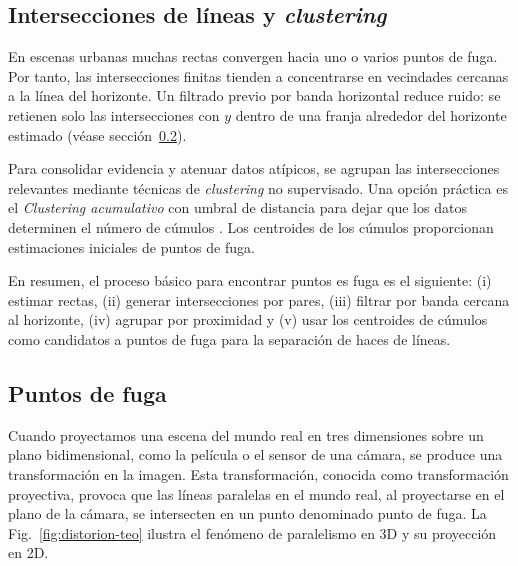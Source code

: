 \subsection{Intersecciones de líneas y \emph{clustering}}\label{sec:intersections-clustering}

En escenas urbanas muchas rectas convergen hacia uno o varios puntos de fuga. Por tanto, las
intersecciones finitas tienden a concentrarse en vecindades cercanas a la línea del horizonte. Un filtrado previo por banda horizontal reduce ruido: se retienen solo las intersecciones con \(y\) dentro de una franja alrededor del horizonte estimado (véase sección~\ref{sec:vanishing-points}).


Para consolidar evidencia y atenuar datos atípicos, se agrupan las intersecciones relevantes mediante técnicas de \emph{clustering} no supervisado. Una opción práctica es el \emph{Clustering acumulativo} con umbral de distancia para dejar que los datos determinen el número de cúmulos \cite{tan2005introduction}. Los centroides de los cúmulos proporcionan estimaciones iniciales de puntos de fuga\cite{kanatani1998statistical,hartley2003multiple}.


En resumen, el proceso básico para encontrar puntos es fuga es el siguiente: (i) estimar rectas, (ii) generar intersecciones por pares, (iii) filtrar por banda cercana al horizonte, (iv) agrupar por proximidad y (v) usar los centroides de cúmulos como candidatos a puntos de fuga para la separación de haces de líneas.

\subsection{Puntos de fuga}\label{sec:vanishing-points}

Cuando proyectamos una escena del mundo real en tres dimensiones sobre un plano bidimensional,
como la película o el sensor de una cámara, se produce una transformación en la imagen.
Esta transformación, conocida como transformación proyectiva, provoca que las líneas paralelas en el mundo real,
al proyectarse en el plano de la cámara, se intersecten en un punto denominado punto de fuga.
La Fig.~\ref{fig:distorion-teo} ilustra el fenómeno de paralelismo en 3D y su proyección en 2D.

